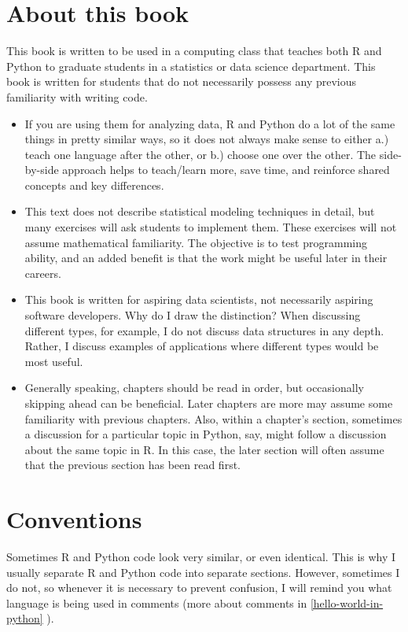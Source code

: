 \documentclass[
  12pt,
  krantz2]{krantz}
\begin{document}
\hypertarget{about-this-book}{%
\section*{About this book}\label{about-this-book}}


This book is written to be used in a computing class that teaches both R and Python to graduate students in a statistics or data science department. This book is written for students that do not necessarily possess any previous familiarity with writing code.

\begin{itemize}
\item
  If you are using them for analyzing data, R and Python do a lot of the same things in pretty similar ways, so it does not always make sense to either a.) teach one language after the other, or b.) choose one over the other. The side-by-side approach helps to teach/learn more, save time, and reinforce shared concepts and key differences.
\item
  This text does not describe statistical modeling techniques in detail, but many exercises will ask students to implement them. These exercises will not assume mathematical familiarity. The objective is to test programming ability, and an added benefit is that the work might be useful later in their careers.
\item
  This book is written for aspiring data scientists, not necessarily aspiring software developers. Why do I draw the distinction? When discussing different types, for example, I do not discuss data structures in any depth. Rather, I discuss examples of applications where different types would be most useful.
\item
  Generally speaking, chapters should be read in order, but occasionally skipping ahead can be beneficial. Later chapters are more may assume some familiarity with previous chapters. Also, within a chapter's section, sometimes a discussion for a particular topic in Python, say, might follow a discussion about the same topic in R. In this case, the later section will often assume that the previous section has been read first.
\end{itemize}

\hypertarget{conventions}{%
\section*{Conventions}\label{conventions}}


Sometimes R and Python code look very similar, or even identical. This is why I usually separate R and Python code into separate sections. However, sometimes I do not, so whenever it is necessary to prevent confusion, I will remind you what language is being used in comments (more about comments in \ref{hello-world-in-python} ).
\end{document}

